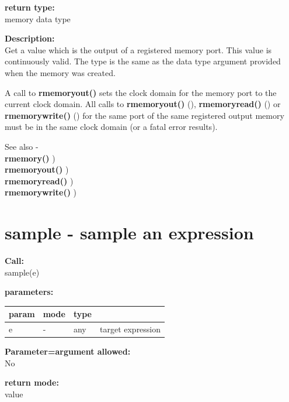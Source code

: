        {\bf return type:} \\
        memory data type
        
        {\bf Description:} \\
        Get a value which is the output of a registered memory port.
        This value is continuously valid. The type is the same as the
        data type argument provided when the memory was created.
        
        A call to {\bf rmemoryout()} sets the clock domain for the memory port to
        the current clock domain. All calls to {\bf rmemoryout()}
        (), {\bf rmemoryread()} () or {\bf
        rmemorywrite()} () for the same port of the same
        registered output memory must be in the same clock domain (or a fatal
        error results).
        
        See also - \\
        {\bf rmemory()} ) \\
        {\bf rmemoryout()} ) \\
        {\bf rmemoryread()} ) \\
        {\bf rmemorywrite()} ) \\
            


    \section{sample - sample an expression}\label{sec:ifsample}

        {\bf Call:} \\
        sample(e)

        {\bf parameters:} \\
        \begin{tabular}{| l | l | l | l |}
        \hline
        param  & mode & type & \\
        \hline \hline
        e & - & any & target expression  \\ \hline
        \end{tabular}

        {\bf Parameter=argument allowed:} \\
        No
        
        {\bf return mode:} \\
        value


